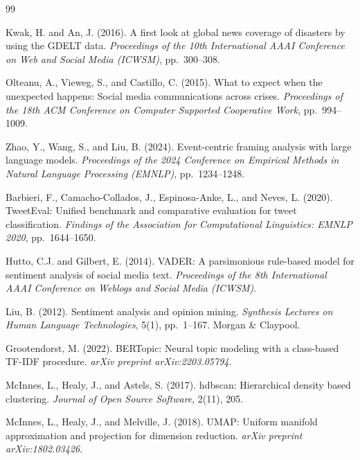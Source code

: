 \documentclass[12pt, letterpaper]{article}
\begin{document}
\newpage
\begin{thebibliography}{99}

Kwak, H. and An, J. (2016).
A first look at global news coverage of disasters by using the GDELT data.
\textit{Proceedings of the 10th International AAAI Conference on Web and Social Media (ICWSM)}, pp.\ 300--308.

Olteanu, A., Vieweg, S., and Castillo, C. (2015).
What to expect when the unexpected happens: Social media communications across crises.
\textit{Proceedings of the 18th ACM Conference on Computer Supported Cooperative Work}, pp.\ 994--1009.

Zhao, Y., Wang, S., and Liu, B. (2024).
Event-centric framing analysis with large language models.
\textit{Proceedings of the 2024 Conference on Empirical Methods in Natural Language Processing (EMNLP)}, pp.\ 1234--1248.

Barbieri, F., Camacho-Collados, J., Espinosa-Anke, L., and Neves, L. (2020).
TweetEval: Unified benchmark and comparative evaluation for tweet classification.
\textit{Findings of the Association for Computational Linguistics: EMNLP 2020}, pp.\ 1644--1650.

Hutto, C.J. and Gilbert, E. (2014).
VADER: A parsimonious rule-based model for sentiment analysis of social media text.
\textit{Proceedings of the 8th International AAAI Conference on Weblogs and Social Media (ICWSM)}.

Liu, B. (2012).
Sentiment analysis and opinion mining.
\textit{Synthesis Lectures on Human Language Technologies}, 5(1), pp.\ 1--167. Morgan \& Claypool.

Grootendorst, M. (2022).
BERTopic: Neural topic modeling with a class-based TF-IDF procedure.
\textit{arXiv preprint arXiv:2203.05794}.

McInnes, L., Healy, J., and Astels, S. (2017).
hdbscan: Hierarchical density based clustering.
\textit{Journal of Open Source Software}, 2(11), 205.

McInnes, L., Healy, J., and Melville, J. (2018).
UMAP: Uniform manifold approximation and projection for dimension reduction.
\textit{arXiv preprint arXiv:1802.03426}.


\end{thebibliography}
\end{document}

